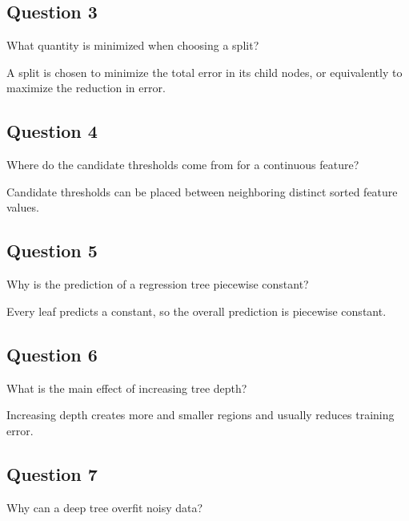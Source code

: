 \documentclass[10pt]{article}
\begin{document}
\par\endgroup

\subsection*{Question 3}
What quantity is minimized when choosing a split?

\begingroup\color{red}

A split is chosen to minimize the total error in its child nodes, or
equivalently to maximize the reduction in error.

\par\endgroup

\subsection*{Question 4}
Where do the candidate thresholds come from for a continuous feature?

\begingroup\color{red}

Candidate thresholds can be placed between neighboring distinct
sorted feature values.

\par\endgroup

\subsection*{Question 5}
Why is the prediction of a regression tree piecewise constant?

\begingroup\color{red}

Every leaf predicts a constant, so the overall prediction is
piecewise constant.

\par\endgroup

\subsection*{Question 6}
What is the main effect of increasing tree depth?

\begingroup\color{red}

Increasing depth creates more and smaller regions and usually
reduces training error.

\par\endgroup

\subsection*{Question 7}
Why can a deep tree overfit noisy data?
\end{document}
